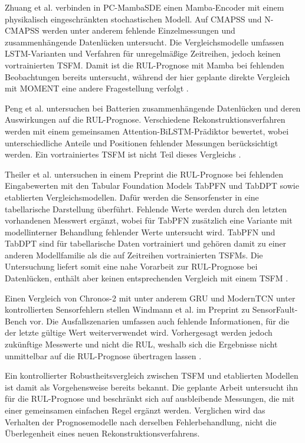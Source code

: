 Zhuang et al. verbinden in PC-MambaSDE einen Mamba-Encoder mit einem physikalisch eingeschränkten stochastischen Modell. Auf \ac{CMAPSS} und N-CMAPSS werden unter anderem fehlende Einzelmessungen und zusammenhängende Datenlücken untersucht. Die Vergleichsmodelle umfassen \ac{LSTM}-Varianten und Verfahren für unregelmäßige Zeitreihen, jedoch keinen vortrainierten \ac{TSFM}. Damit ist die \ac{RUL}-Prognose mit Mamba bei fehlenden Beobachtungen bereits untersucht, während der hier geplante direkte Vergleich mit MOMENT eine andere Fragestellung verfolgt \parencite[Abschn.~5.1--5.2]{zhuangPhysicallyConstrainedMambaSDE2026}.

Peng et al. untersuchen bei Batterien zusammenhängende Datenlücken und deren Auswirkungen auf die \ac{RUL}-Prognose. Verschiedene Rekonstruktionsverfahren werden mit einem gemeinsamen Attention-BiLSTM-Prädiktor bewertet, wobei unterschiedliche Anteile und Positionen fehlender Messungen berücksichtigt werden. Ein vortrainiertes \ac{TSFM} ist nicht Teil dieses Vergleichs \parencite{pengMacroAnchoredPhysicsInformed2026}.

Theiler et al. untersuchen in einem Preprint die \ac{RUL}-Prognose bei fehlenden Eingabewerten mit den Tabular Foundation Models TabPFN und TabDPT sowie etablierten Vergleichsmodellen. Dafür werden die Sensorfenster in eine tabellarische Darstellung überführt. Fehlende Werte werden durch den letzten vorhandenen Messwert ergänzt, wobei für TabPFN zusätzlich eine Variante mit modellinterner Behandlung fehlender Werte untersucht wird. TabPFN und TabDPT sind für tabellarische Daten vortrainiert und gehören damit zu einer anderen Modellfamilie als die auf Zeitreihen vortrainierten \acp{TSFM}. Die Untersuchung liefert somit eine nahe Vorarbeit zur \ac{RUL}-Prognose bei Datenlücken, enthält aber keinen entsprechenden Vergleich mit einem \ac{TSFM} \parencite[Abschn.~5.1--5.2 und 6.0.4]{theilerTowardsUnifiedDataEfficient2026}.

Einen Vergleich von Chronos-2 mit unter anderem \ac{GRU} und ModernTCN unter kontrollierten Sensorfehlern stellen Windmann et al. im Preprint zu SensorFault-Bench vor. Die Ausfallszenarien umfassen auch fehlende Informationen, für die der letzte gültige Wert weiterverwendet wird. Vorhergesagt werden jedoch zukünftige Messwerte und nicht die \ac{RUL}, weshalb sich die Ergebnisse nicht unmittelbar auf die \ac{RUL}-Prognose übertragen lassen \parencite[Abschn.~3.1--3.2 und B.5.4]{windmannBenchmarkingSensorFault2026}.

Ein kontrollierter Robustheitsvergleich zwischen \ac{TSFM} und etablierten Modellen ist damit als Vorgehensweise bereits bekannt. Die geplante Arbeit untersucht ihn für die \ac{RUL}-Prognose und beschränkt sich auf ausbleibende Messungen, die mit einer gemeinsamen einfachen Regel ergänzt werden. Verglichen wird das Verhalten der Prognosemodelle nach derselben Fehlerbehandlung, nicht die Überlegenheit eines neuen Rekonstruktionsverfahrens.

